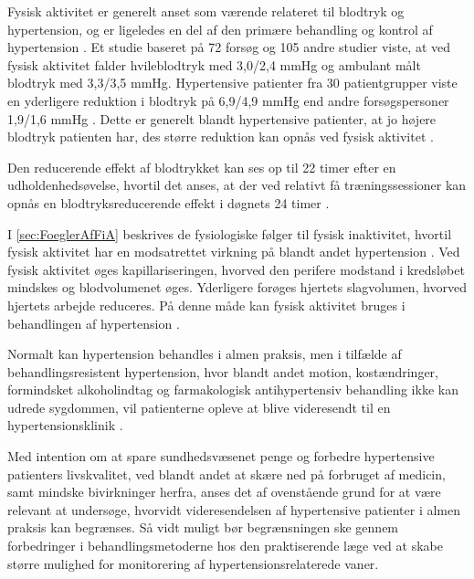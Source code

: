Fysisk aktivitet er generelt anset som værende relateret til blodtryk og hypertension, og er ligeledes en del af den primære behandling og kontrol af hypertension \citep{pescatello2004, fagard2006}.
Et studie baseret på 72 forsøg og 105 andre studier viste, at ved fysisk aktivitet falder hvileblodtryk med 3,0/2,4 mmHg og ambulant målt blodtryk med 3,3/3,5 mmHg. 
Hypertensive patienter fra 30 patientgrupper viste en yderligere reduktion i blodtryk på 6,9/4,9 mmHg end andre forsøgspersoner 1,9/1,6 mmHg \citep{fagard2006}. 
Dette er generelt blandt hypertensive patienter, at jo højere blodtryk patienten har, des større reduktion kan opnås ved fysisk aktivitet \citep{pedersen2011, pescatello2004}.

Den reducerende effekt af blodtrykket kan ses op til 22 timer efter en udholdenhedsøvelse, hvortil det anses, at der ved relativt få træningssessioner kan opnås en blodtryksreducerende effekt i døgnets 24 timer \citep{pescatello2004}.


I \autoref{sec:FoeglerAfFiA} beskrives de fysiologiske følger til fysisk inaktivitet, hvortil fysisk aktivitet har en modsatrettet virkning på blandt andet hypertension \citep{pedersen2011}. Ved fysisk aktivitet øges kapillariseringen, hvorved den perifere modstand i kredsløbet mindskes og blodvolumenet øges. Yderligere forøges hjertets slagvolumen, hvorved hjertets arbejde reduceres. På denne måde kan fysisk aktivitet bruges i behandlingen af hypertension \citep{andersen2001}.

Normalt kan hypertension behandles i almen praksis, men i tilfælde af behandlingsresistent hypertension, hvor blandt andet motion, kostændringer, formindsket alkoholindtag og farmakologisk antihypertensiv behandling ikke kan udrede sygdommen, vil patienterne opleve at blive videresendt til en hypertensionsklinik \cite{lodberg2016, bech2015}.

Med intention om at spare sundhedsvæsenet penge og forbedre hypertensive patienters livskvalitet, ved blandt andet at skære ned på forbruget af medicin, samt mindske bivirkninger herfra, anses det af ovenstående grund for at være relevant at undersøge, hvorvidt videresendelsen af hypertensive patienter i almen praksis kan begrænses. Så vidt muligt bør begrænsningen ske gennem forbedringer i behandlingsmetoderne hos den praktiserende læge ved at skabe større mulighed for monitorering af hypertensionsrelaterede vaner. 